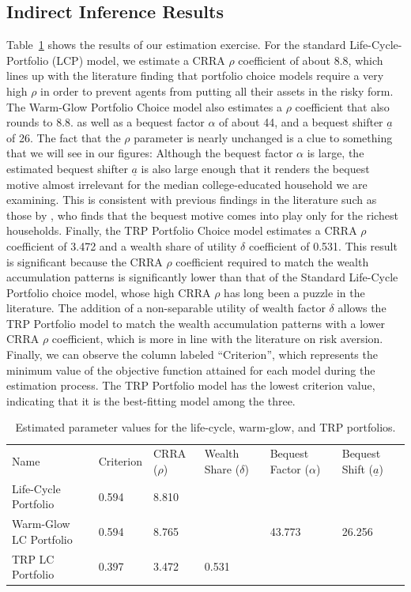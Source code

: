 \documentclass{article}
\newcommand{\CRRA}{\rho}
\begin{document}
\subsection{Indirect Inference Results}

Table~\ref{parameters} shows the results of our estimation exercise.
For the standard Life-Cycle-Portfolio (LCP) model, we estimate a CRRA $\CRRA$ coefficient of about 8.8, which lines up with the literature finding that portfolio choice models require a very high $\CRRA$ in order to prevent agents from putting all their assets in the risky form.
The Warm-Glow Portfolio Choice model also estimates a $\CRRA$ coefficient that also rounds to 8.8.
as well as a bequest factor $\alpha$ of about 44, and a bequest shifter $\underline{a}$ of 26.
The fact that the $\CRRA$ parameter is nearly unchanged is a clue to something that we will see in our figures: Although the bequest factor $\alpha$ is large, the estimated bequest shifter $\underline{a}$ is also large enough that it renders the bequest motive almost irrelevant for the median college-educated household we are examining.
This is consistent with previous findings in the literature such as those by \cite{deNardiBequest}, who finds that the bequest motive comes into play only for the richest households.
Finally, the TRP Portfolio Choice model estimates a CRRA $\CRRA$ coefficient of 3.472 and a wealth share of utility $\delta$ coefficient of 0.531.
This result is significant because the CRRA $\CRRA$ coefficient required to match the wealth accumulation patterns is significantly lower than that of the Standard Life-Cycle Portfolio choice model, whose high CRRA $\CRRA$ has long been a puzzle in the literature.
The addition of a non-separable utility of wealth factor $\delta$ allows the TRP Portfolio model to match the wealth accumulation patterns with a lower CRRA $\CRRA$ coefficient, which is more in line with the literature on risk aversion.
Finally, we can observe the column labeled ``Criterion'', which represents the minimum value of the objective function attained for each model during the estimation process.
The TRP Portfolio model has the lowest criterion value, indicating that it is the best-fitting model among the three.

\begin{table}
\centering
\caption[]{Estimated parameter values for the life-cycle, warm-glow, and TRP portfolios.}
\label{parameters}
\begin{tabular}{p{}p{}p{}p{}p{}p{}}
\toprule
Name & Criterion & CRRA ($\CRRA$) & Wealth Share ($\delta$) & Bequest Factor ($\alpha$) & Bequest Shift ($\underline{a}$) \\
Life-Cycle Portfolio & 0.594 & 8.810 &  &  &  \\
Warm-Glow LC Portfolio & 0.594 & 8.765 &  & 43.773 & 26.256 \\
TRP LC Portfolio & 0.397 & 3.472 & 0.531 &  &  \\
\bottomrule
\end{tabular}
\end{table}
\end{document}
